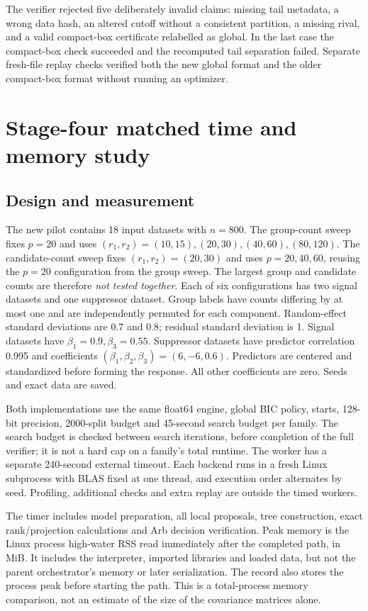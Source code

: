 \documentclass[11pt,a4paper]{article}
\theoremstyle{remark}\newtheorem{remark}[theorem]{Remark}
\begin{document}
The verifier rejected five deliberately invalid claims: missing tail metadata,
a wrong data hash, an altered cutoff without a consistent partition, a missing
rival, and a valid compact-box certificate relabelled as global. In the last
case the compact-box check succeeded and the recomputed tail separation failed.
Separate fresh-file replay checks verified both the new global format and the
older compact-box format without running an optimizer.

\section{Stage-four matched time and memory study}\label{sec:scalingpilot}
\subsection{Design and measurement}
The new pilot contains 18 input datasets with $n=800$. The group-count sweep
fixes $p=20$ and uses $(r_1,r_2)=(10,15),(20,30),(40,60),(80,120)$. The
candidate-count sweep fixes $(r_1,r_2)=(20,30)$ and uses $p=20,40,60$, reusing the
$p=20$ configuration from the group sweep. The largest group and candidate
counts are therefore \emph{not tested together}. Each of six configurations
has two signal datasets and one suppressor dataset. Group labels have counts
differing by at most one and are independently permuted for each component.
Random-effect standard deviations are 0.7 and 0.8; residual standard deviation
is 1. Signal datasets have $\beta_1=0.9,\beta_3=0.55$. Suppressor datasets have
predictor correlation 0.995 and coefficients
$(\beta_1,\beta_2,\beta_3)=(6,-6,0.6)$.
Predictors are centered and standardized before forming the response.
All other coefficients are zero. Seeds and exact data are saved.

Both implementations use the same float64 engine, global BIC policy, starts,
128-bit precision, 2000-split budget and 45-second search budget per family.
The search budget is checked between search iterations, before completion of
the full verifier; it is not a hard cap on a family's total runtime. The worker
has a separate 240-second external timeout. Each backend runs in a fresh Linux
subprocess with BLAS fixed at one thread, and execution order alternates by seed.
Profiling, additional checks and extra replay are outside the timed workers.

The timer includes model preparation, all local proposals, tree construction,
exact rank/projection calculations and Arb decision verification. Peak memory
is the Linux process high-water RSS read immediately after the completed path,
in MiB. It includes the interpreter, imported libraries and loaded data, but not
the parent orchestrator's memory or later serialization. The record also stores
the process peak before starting the path. This is a total-process memory
comparison, not an estimate of the size of the covariance matrices alone.
\end{document}
